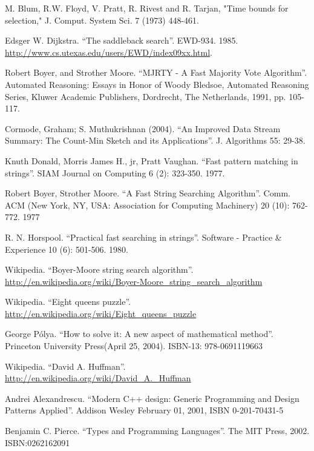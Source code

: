 \documentclass[b5paper]{ctexart}
\begin{document}
\begin{thebibliography}{99}

M. Blum, R.W. Floyd, V. Pratt, R. Rivest and R. Tarjan, "Time bounds for selection," J. Comput. System Sci. 7 (1973) 448-461.

Edsger W. Dijkstra. ``The saddleback search''. EWD-934. 1985. \url{http://www.cs.utexas.edu/users/EWD/index09xx.html}.

Robert Boyer, and Strother Moore. ``MJRTY - A Fast Majority Vote Algorithm''. Automated Reasoning: Essays in Honor of Woody Bledsoe, Automated Reasoning Series, Kluwer Academic Publishers, Dordrecht, The Netherlands, 1991, pp. 105-117.

Cormode, Graham; S. Muthukrishnan (2004). ``An Improved Data Stream Summary: The Count-Min Sketch and its Applications''. J. Algorithms 55: 29-38.

Knuth Donald, Morris James H., jr, Pratt Vaughan. ``Fast pattern matching in strings''. SIAM Journal on Computing 6 (2): 323-350. 1977.

Robert Boyer, Strother Moore. ``A Fast String Searching Algorithm''. Comm. ACM (New York, NY, USA: Association for Computing Machinery) 20 (10): 762-772. 1977

R. N. Horspool. ``Practical fast searching in strings''. Software - Practice \& Experience 10 (6): 501-506. 1980.

Wikipedia. ``Boyer-Moore string search algorithm''. \url{http://en.wikipedia.org/wiki/Boyer-Moore_string_search_algorithm}

Wikipedia. ``Eight queens puzzle''. \url{http://en.wikipedia.org/wiki/Eight_queens_puzzle}

George P\'{o}lya. ``How to solve it: A new aspect of mathematical method''. Princeton University Press(April 25, 2004). ISBN-13: 978-0691119663

Wikipedia. ``David A. Huffman''. \url{http://en.wikipedia.org/wiki/David_A._Huffman}


Andrei Alexandrescu. ``Modern C++ design: Generic Programming and Design Patterns Applied''. Addison Wesley February 01, 2001, ISBN 0-201-70431-5

Benjamin C. Pierce. ``Types and Programming Languages''. The MIT Press, 2002. ISBN:0262162091


\end{thebibliography}
\end{document}
